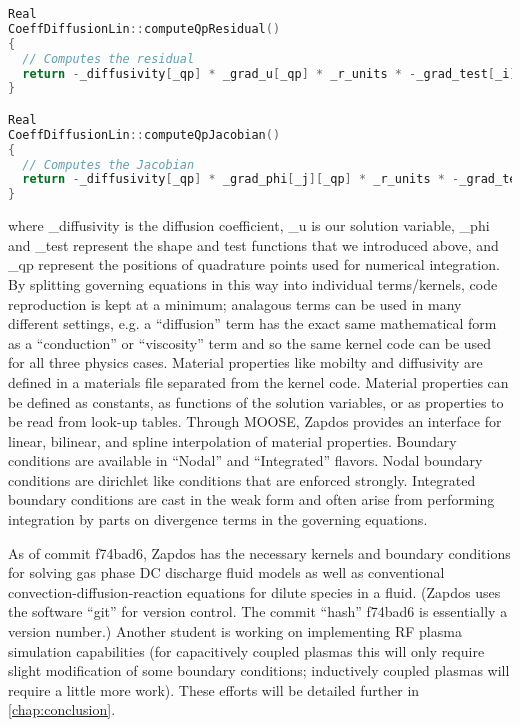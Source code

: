 \begin{lstlisting}[language=C++,caption = Example of residual and Jacobian function definitions, label = code:resid_jacob]
Real
CoeffDiffusionLin::computeQpResidual()
{
  // Computes the residual
  return -_diffusivity[_qp] * _grad_u[_qp] * _r_units * -_grad_test[_i][_qp] * _r_units;
}

Real
CoeffDiffusionLin::computeQpJacobian()
{
  // Computes the Jacobian
  return -_diffusivity[_qp] * _grad_phi[_j][_qp] * _r_units * -_grad_test[_i][_qp] * _r_units;
}
\end{lstlisting}

where \_diffusivity is the diffusion coefficient, \_u is our solution variable, \_phi and \_test represent the shape and test functions that we introduced above, and \_qp represent the positions of quadrature points used for numerical integration. By splitting governing equations in this way into individual terms/kernels, code reproduction is kept at a minimum; analagous terms can be used in many different settings, e.g. a ``diffusion'' term has the exact same mathematical form as a ``conduction'' or ``viscosity'' term and so the same kernel code can be used for all three physics cases. Material properties like mobilty and diffusivity are defined in a materials file separated from the kernel code. Material properties can be defined as constants, as functions of the solution variables, or as properties to be read from look-up tables. Through MOOSE, Zapdos provides an interface for linear, bilinear, and spline interpolation of material properties. Boundary conditions are available in ``Nodal'' and ``Integrated'' flavors. Nodal boundary conditions are dirichlet like conditions that are enforced strongly. Integrated boundary conditions are cast in the weak form and often arise from performing integration by parts on divergence terms in the governing equations.

As of commit f74bad6, Zapdos has the necessary kernels and boundary conditions for solving gas phase DC discharge fluid models as well as conventional convection-diffusion-reaction equations for dilute species in a fluid. (Zapdos uses the software ``git'' for version control. The commit ``hash'' f74bad6 is essentially a version number.) Another student is working on implementing RF plasma simulation capabilities (for capacitively coupled plasmas this will only require slight modification of some boundary conditions; inductively coupled plasmas will require a little more work). These efforts will be detailed further in \cref{chap:conclusion}.

